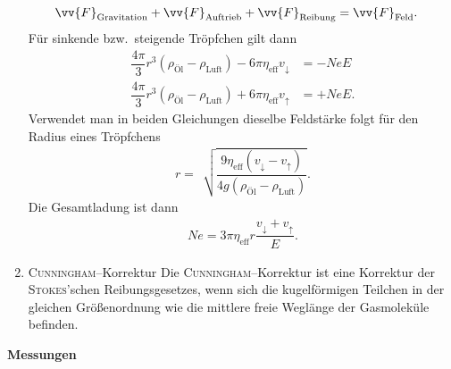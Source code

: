 \begin{enumerate}[label=--]
\begin{align}
                        \vv{F}_\text{Gravitation}+\vv{F}_\text{Auftrieb}+\vv{F}_\text{Reibung}&=\vv{F}_\text{Feld}
                .\end{align} 
                Für sinkende bzw.\ steigende Tröpfchen gilt dann
                \begin{align} 
                        \dfrac{4\pi }{3}r^3\left(\rho _\text{Öl}-\rho _\text{Luft}\right)-6\pi \eta_\text{eff}v_\downarrow&=-NeE\\
                        \dfrac{4\pi }{3}r^3\left(\rho _\text{Öl}-\rho _\text{Luft}\right)+6\pi \eta_\text{eff}v_\uparrow&=+NeE
                .\end{align} 
                Verwendet man in beiden Gleichungen dieselbe Feldstärke folgt für den Radius eines Tröpfchens
                \begin{align} 
                        r=\,\sqrt[]{\dfrac{9 \eta_\text{eff}\left(v_\downarrow-v_\uparrow\right)}{4g\left(\rho _\text{Öl}-\rho _\text{Luft}\right)}}
                .\end{align} 
                Die Gesamtladung ist dann
                \begin{align} 
                        Ne=3\pi \eta_\text{eff}r\dfrac{v_\downarrow+v_\uparrow}{E}
                .\end{align} 
        \item \textsc{Cunningham}--Korrektur \hspace{25pt}
                Die \textsc{Cunningham}--Korrektur ist eine Korrektur der \textsc{Stokes}'schen Reibungsgesetzes, wenn sich die kugelförmigen Teilchen in der gleichen Größenordnung wie die mittlere freie Weglänge der Gasmoleküle befinden.
\end{enumerate}
\textbf{Messungen} 
